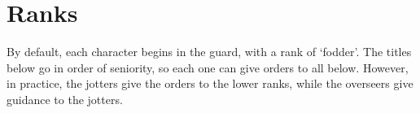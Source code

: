 \section{Ranks}

\begin{multicols}{2}

\noindent
By default, each character begins in the \gls{guard}, with a rank of `\gls{fodder}'.
The titles below go in order of seniority, so each one can give orders to all below.
However, in practice, the \glspl{jotter} give the orders to the lower ranks, while the \glspl{overseer} give guidance to the \glspl{jotter}.

\subsubsection{}

\subsubsection{}

\subsubsection{}

\subsubsection{}

\subsubsection{}

\subsubsection{}

\subsubsection{}

\subsubsection{}

\subsubsection{}

\end{multicols}
